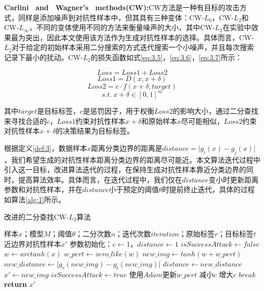 \noindent\textbf{Carlini \ and \ Wagner's \ methods(CW):}CW\cite{carlini2017towards}方法是一种有目标的攻击方式，同样是添加噪声到对抗性样本中，但其具有三种变体：CW-$L_0$，CW-$L_2$和CW-$L_{\infty}$，不同的变体使用不同的方法来衡量噪声的大小，其中CW-$L_2$在实验中效果最为突出，因此本文使用该方法作为生成对抗性样本的选择。具体而言，CW-$L_2$对于给定的初始样本采用二分搜索的方式迭代搜索一个小噪声，并且每次搜索记录下最小的扰动。CW-$L_2$的损失函数如式\ref{eq:3.5}，\ref{eq:3.6}，\ref{eq:3.7}所示：

\begin{equation}
	\label{eq:3.5}
	Loss = Loss1 + Loss2 
\end{equation}
\begin{equation}
	\label{eq:3.6}
	Loss1 = D(x, x + \delta)
\end{equation}
\begin{equation}
	\label{eq:3.7}
	Loss2 = c \cdot f(x + \delta,target)
\end{equation}
$$s.t. \ x + \delta \in [0,1]^m$$

\noindent 其中$target$是目标标签，$c$是惩罚因子，用于权衡$Loss2$的影响大小，通过二分查找来寻找合适的$c$，$Loss1$约束对抗性样本$x + \delta$和原始样本$x$尽可能相似，$Loss2$约束对抗性样本$x + \delta$的决策结果为目标标签。

根据定义\ref{def:3}，数据样本$x$距离分类边界的距离是$distance = \vert g_i(x) - g_j(x) \vert$，我们希望生成的对抗性样本距离分类边界的距离尽可能近。本文算法迭代过程中引入这一目标，改进算法迭代的过程，在保持生成对抗性样本靠近分类边界的同时，提高算法效率。具体而言，在迭代过程中，我们仅在$distance$变小时更新距离参数和对抗性样本，并在$distance$小于预定的阈值$\theta$时提前终止迭代，具体的过程如算法\ref{alg:1}所示。

\begin{algorithm}[H] 
	\caption{改进的二分查找CW-$L_2$算法}
	\label{alg:1}
	\begin{algorithmic}[1]
		
		\Require 样本$x$；模型$M$；阈值$\theta$；二分次数$n$；迭代次数$iteration$；原始标签$r$；目标标签$t$
		\Ensure 近边界对抗性样本$x'$
		\State 参数初始化：$c\gets1$，$distance \gets 1$
			\State $isSuccessAttack \gets false$
			\State $w \gets arctanh(x)$
			\State $w\_pert \gets zero\_like(w)$
				\State $new\_img \gets tanh(w + w\_pert)$
				\State $new\_distance \gets \vert g_r(new\_img) - g_t(new\_img) \vert$
					\State $distance \gets new\_distance$
					\State $x' \gets new\_img$
					\State $isSuccessAttack \gets true$
				\EndIf
				\State 使用$Adam$更新$w\_pert$
			\EndFor
			\State 减小$c$
			\Else \State 增大$c$
			\EndIf 
			\State $break$
			\EndIf
		\EndFor
		\State \textbf{return} $x'$
	\end{algorithmic}
\end{algorithm}



